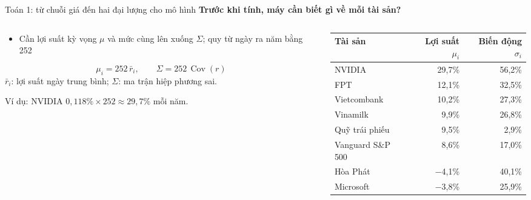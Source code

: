 \documentclass[aspectratio=169,10pt]{beamer}
\newcommand{\con}[1]{\textcolor{black!50}{#1}}
\let\small\normalsize
\newcommand{\lead}[1]{{\color{structure}\bfseries #1}\par\vspace{5pt}}
\begin{document}
\begin{frame}[t]{Toán 1: từ chuỗi giá đến hai đại lượng cho mô hình}
  \lead{Trước khi tính, máy cần biết gì về mỗi tài sản?}
  \begin{columns}[T]
    \begin{column}{0.48\textwidth}
      \begin{itemize}
        \item Cần lợi suất kỳ vọng \(\mu\) và mức cùng lên xuống \(\Sigma\); quy từ ngày ra năm bằng 252
      \end{itemize}
      \[ \mu_i = 252\,\bar r_i, \qquad \Sigma = 252\,\operatorname{Cov}(r) \]
      {\small \(\bar r_i\): lợi suất ngày trung bình; \(\Sigma\): ma trận hiệp phương sai.}

      \vspace{3pt}
      {\small Ví dụ: NVIDIA \(0{,}118\%\times 252\approx 29{,}7\%\) mỗi năm.}
    \end{column}
    \begin{column}{0.48\textwidth}
      \small\setlength{\tabcolsep}{3pt}
      \begin{tabular}{@{}lrr@{}}
        \toprule
        Tài sản & Lợi suất \(\mu_i\) & Biến động \(\sigma_i\) \\
        \midrule
        NVIDIA & 29,7\% & 56,2\% \\
        FPT & 12,1\% & 32,5\% \\
        Vietcombank & 10,2\% & 27,3\% \\
        Vinamilk & 9,9\% & 26,8\% \\
        Quỹ trái phiếu & 9,5\% & 2,9\% \\
        Vanguard S\&P 500 & 8,6\% & 17,0\% \\
        Hòa Phát & \con{−4,1\%} & 40,1\% \\
        Microsoft & \con{−3,8\%} & 25,9\% \\
        \bottomrule
      \end{tabular}

    \end{column}
  \end{columns}
\end{frame}
\end{document}

